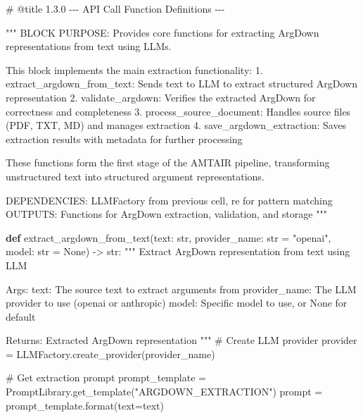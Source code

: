 \documentclass[
  11pt,
  letterpaper,
]{book}
\newenvironment{Shaded}{\begin{snugshade}}{\end{snugshade}}
\newcommand{\BuiltInTok}[1]{\textcolor[rgb]{0.00,0.23,0.31}{#1}}
\newcommand{\CommentTok}[1]{\textcolor[rgb]{0.37,0.37,0.37}{#1}}
\newcommand{\KeywordTok}[1]{\textcolor[rgb]{0.00,0.23,0.31}{\textbf{#1}}}
\newcommand{\NormalTok}[1]{\textcolor[rgb]{0.00,0.23,0.31}{#1}}
\newcommand{\OperatorTok}[1]{\textcolor[rgb]{0.37,0.37,0.37}{#1}}
\newcommand{\StringTok}[1]{\textcolor[rgb]{0.13,0.47,0.30}{#1}}
\newcommand{\VariableTok}[1]{\textcolor[rgb]{0.07,0.07,0.07}{#1}}
\begin{document}
\begin{Shaded}
\begin{Highlighting}[]
\CommentTok{\# @title 1.3.0 {-}{-}{-} API Call Function Definitions {-}{-}{-}}

\CommentTok{"""}
\CommentTok{BLOCK PURPOSE: Provides core functions for extracting ArgDown representations from text using LLMs.}

\CommentTok{This block implements the main extraction functionality:}
\CommentTok{1. extract\_argdown\_from\_text: Sends text to LLM to extract structured ArgDown representation}
\CommentTok{2. validate\_argdown: Verifies the extracted ArgDown for correctness and completeness}
\CommentTok{3. process\_source\_document: Handles source files (PDF, TXT, MD) and manages extraction}
\CommentTok{4. save\_argdown\_extraction: Saves extraction results with metadata for further processing}

\CommentTok{These functions form the first stage of the AMTAIR pipeline, transforming}
\CommentTok{unstructured text into structured argument representations.}

\CommentTok{DEPENDENCIES: LLMFactory from previous cell, re for pattern matching}
\CommentTok{OUTPUTS: Functions for ArgDown extraction, validation, and storage}
\CommentTok{"""}

\KeywordTok{def}\NormalTok{ extract\_argdown\_from\_text(text: }\BuiltInTok{str}\NormalTok{, provider\_name: }\BuiltInTok{str} \OperatorTok{=} \StringTok{"openai"}\NormalTok{, model: }\BuiltInTok{str} \OperatorTok{=} \VariableTok{None}\NormalTok{) }\OperatorTok{{-}\textgreater{}} \BuiltInTok{str}\NormalTok{:}
    \CommentTok{"""}
\CommentTok{    Extract ArgDown representation from text using LLM}

\CommentTok{    Args:}
\CommentTok{        text: The source text to extract arguments from}
\CommentTok{        provider\_name: The LLM provider to use (openai or anthropic)}
\CommentTok{        model: Specific model to use, or None for default}

\CommentTok{    Returns:}
\CommentTok{        Extracted ArgDown representation}
\CommentTok{    """}
    \CommentTok{\# Create LLM provider}
\NormalTok{    provider }\OperatorTok{=}\NormalTok{ LLMFactory.create\_provider(provider\_name)}

    \CommentTok{\# Get extraction prompt}
\NormalTok{    prompt\_template }\OperatorTok{=}\NormalTok{ PromptLibrary.get\_template(}\StringTok{"ARGDOWN\_EXTRACTION"}\NormalTok{)}
\NormalTok{    prompt }\OperatorTok{=}\NormalTok{ prompt\_template.}\BuiltInTok{format}\NormalTok{(text}\OperatorTok{=}\NormalTok{text)}


\end{Highlighting}
\end{Shaded}
\end{document}
